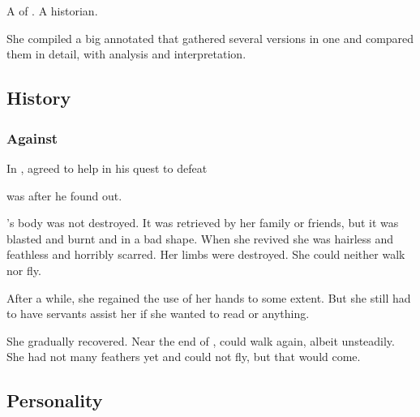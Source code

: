 \section{\Urizeth}
\index{\Urizeth}
A \thelyad{} \resvil{} of \CiriathSepher. 
A historian. 

She compiled a big annotated \emph{} that gathered several versions in one and compared them in detail, with analysis and interpretation. 









\subsection{History}





\subsubsection{Against \Ishnaruchaefir}
In \TwilightAngelRememberEmph, \Urizeth agreed to help \Teshrial in his quest to defeat \QuessanthIshnaruchaefir

\Urizeth was  after he found out. 

\Urizeth's body was not destroyed.
It was retrieved by her family or friends, but it was blasted and burnt and in a bad shape.
When she revived she was hairless and feathless and horribly scarred. 
Her limbs were destroyed. 
She could neither walk nor fly. 

After a while, she regained the use of her hands to some extent.
But she still had to have servants assist her if she wanted to read or anything. 

She gradually recovered. 
Near the end of \TwilightAngelRememberEmph, \Urizeth could walk again, albeit unsteadily.
She had not many feathers yet and could not fly, but that would come.









\subsection{Personality}





